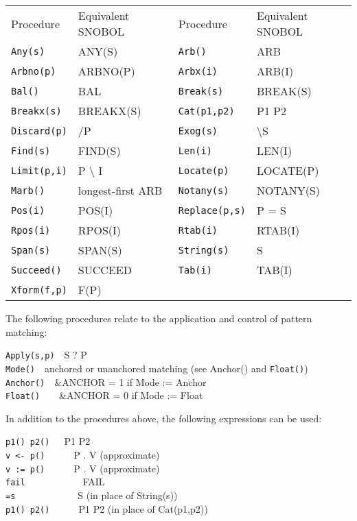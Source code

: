 \begin{xtabular}{m{1.2in} m{1.7in} m{1.2in} m{1.7in}}

Procedure & Equivalent SNOBOL & Procedure & Equivalent SNOBOL \\

\texttt{Any(s)} & ANY(S) & \texttt{Arb()} & ARB\\
\texttt{Arbno(p)} & ARBNO(P) & \texttt{Arbx(i)} & ARB(I)\\
\texttt{Bal()} & BAL & \texttt{Break(s)} & BREAK(S)\\
\texttt{Breakx(s)} & BREAKX(S) & \texttt{Cat(p1,p2)} & P1 P2\\
\texttt{Discard(p)} & /P & \texttt{Exog(s)} & {\textbackslash}S\\
\texttt{Find(s)} & FIND(S) & \texttt{Len(i)} & LEN(I)\\
\texttt{Limit(p,i)} & P {\textbackslash} I & \texttt{Locate(p)} & LOCATE(P)\\
\texttt{Marb()} & longest-first ARB & \texttt{Notany(s)} & NOTANY(S)\\
\texttt{Pos(i)} & POS(I) & \texttt{Replace(p,s)} & P = S\\
\texttt{Rpos(i)} & RPOS(I) & \texttt{Rtab(i)} & RTAB(I)\\
\texttt{Span(s)} & SPAN(S) & \texttt{String(s)} & S\\
\texttt{Succeed()} & SUCCEED & \texttt{Tab(i)} & TAB(I)\\
\texttt{Xform(f,p)} & F(P) \\
\end{xtabular}

The following procedures relate to the application and control of
pattern matching:

\texttt{Apply(s,p)}\ \ S ? P\\
\texttt{Mode()}\ \ anchored or unanchored matching (see Anchor() and
\texttt{Float()})\\
\texttt{Anchor()}\ \ \&ANCHOR = 1 if Mode := Anchor\\
\texttt{Float()}\ \ \ \ \&ANCHOR = 0 if Mode := Float

In addition to the procedures above, the following expressions can be
used:

\texttt{p1() {\textbar} p2()}\ \ \ P1 {\textbar} P2\\
\texttt{v {\textless}- p()}\ \ \ \ \ \ P . V (approximate)\\
\texttt{v := p()}\ \ \ \ \ \ P . V (approximate)\\
\texttt{fail}\ \ \ \ \ \ \ \ \ \ \ \ FAIL\\
\texttt{=s}\ \ \ \ \ \ \ \ \ \ \ \ \ S (in place of String(s))\\
\texttt{p1() {\textbar}{\textbar} p2()}\ \ \ \ \ \ P1 P2 (in place of Cat(p1,p2))

